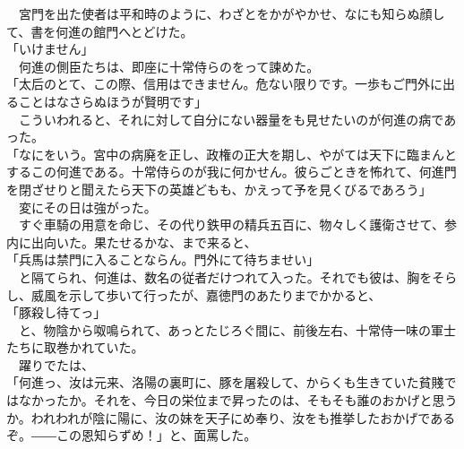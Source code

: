 \documentclass[
  paper=a5,
  fontsize=10pt,
  jafontsize=9.5pt,
  tate,                  %
  open_bracket_pos=nibu, %
]{jlreq}
\begin{document}
　宮門を出た使者は平和時のように、わざとをかがやかせ、なにも知らぬ顔して、書を何進の館門へとどけた。\\


「いけません」\\


　何進の側臣たちは、即座に十常侍らのをって諫めた。\\


「太后のとて、この際、信用はできません。危ない限りです。一歩もご門外に出ることはなさらぬほうが賢明です」\\


　こういわれると、それに対して自分にない器量をも見せたいのが何進の病であった。\\


「なにをいう。宮中の病廃を正し、政権の正大を期し、やがては天下に臨まんとするこの何進である。十常侍らのが我に何かせん。彼らごときを怖れて、何進門を閉ざせりと聞えたら天下の英雄どもも、かえって予を見くびるであろう」\\


　変にその日は強がった。\\


　すぐ車騎の用意を命じ、その代り鉄甲の精兵五百に、物々しく護衛させて、参内に出向いた。果たせるかな、まで来ると、\\


「兵馬は禁門に入ることならん。門外にて待ちませい」\\


　と隔てられ、何進は、数名の従者だけつれて入った。それでも彼は、胸をそらし、威風を示して歩いて行ったが、嘉徳門のあたりまでかかると、\\


「豚殺し待てっ」\\


　と、物陰から呶鳴られて、あっとたじろぐ間に、前後左右、十常侍一味の軍士たちに取巻かれていた。\\


　躍りでたは、\\


「何進っ、汝は元来、洛陽の裏町に、豚を屠殺して、からくも生きていた貧賤ではなかったか。それを、今日の栄位まで昇ったのは、そもそも誰のおかげと思うか。われわれが陰に陽に、汝の妹を天子にめ奉り、汝をも推挙したおかげであるぞ。――この恩知らずめ！」と、面罵した。\\
\end{document}
